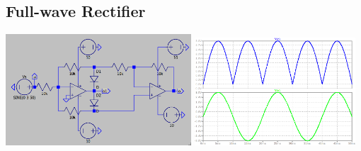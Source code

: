 \documentclass[a4paper, 12pt]{report}
\begin{document}
\begin{center}
\begin{center}
\begin{center}
\begin{center}
\begin{center}
\begin{center}
\begin{center}
\begin{center}
\begin{center}
\begin{center}
\begin{center}
\begin{center}
\section{Full-wave Rectifier}
\begin{center}
    \includegraphics[width=0.52\textwidth]{figures/212c.png}\quad
    \includegraphics[width=0.45\textwidth]{figures/212w.png}\\
\end{center}

\begin{multicols}{2}

\end{multicols}
\end{center}
\end{center}
\end{center}
\end{center}
\end{center}
\end{center}
\end{center}
\end{center}
\end{center}
\end{center}
\end{center}
\end{center}
\end{document}

